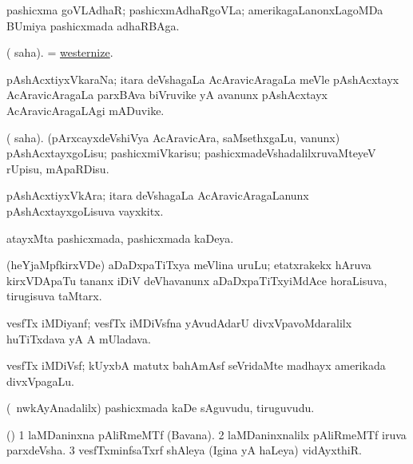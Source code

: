 \bentry
{} 
\gl{\nA}
\expl{}
\bmng
pashicxma goVLAdhaR; pashicxmAdhaRgoVLa; amerikagaLanonxLagoMDa BUmiya pashicxmada adhaRBAga. 
\emng
\eentry

\bentry
{} 
\gl{\sakirx}
\expl{}
\bmng
( saha). = \hyperlink{westernize}{westernize}. 
\emng
\eentry

\bentry
{} 
\gl{\nA}
\expl{}
\bmng
pAshAcxtiyxVkaraNa; itara deVshagaLa AcAravicAragaLa meVle pAshAcxtayx AcAravicAragaLa parxBAva biVruvike yA avanunx pAshAcxtayx AcAravicAragaLAgi mADuvike. 
\emng
\eentry

\bentry
{} 
\gl{\sakirx}
\expl{}
\bmng
( saha). (pArxcayxdeVshiVya AcAravicAra, saMsethxgaLu, \mo vanunx) pAshAcxtayxgoLisu; pashicxmiVkarisu; pashicxmadeVshadalilxruvaMteyeV rUpisu, mApaRDisu. 
\emng
\eentry

\bentry
{} 
\gl{\nA}
\expl{}
\bmng
pAshAcxtiyxVkAra; itara deVshagaLa AcAravicAragaLanunx pAshAcxtayxgoLisuva vayxkitx. 
\emng
\eentry

\bentry
{} 
\gl{\gu}
\expl{}
\bmng
atayxMta pashicxmada, pashicxmada kaDeya. 
\emng
\eentry

\bentry
{} 
\gl{\nA}
\expl{}
\bmng
(heYjaMpfkirxVDe) aDaDxpaTiTxya meVlina uruLu; etatxrakekx hAruva kirxVDApaTu tananx iDiV deVhavanunx aDaDxpaTiTxyiMdAce horaLisuva, tirugisuva taMtarx. 
\emng
\eentry

\bentry
{} 
\gl{\nA}
\expl{}
\bmng
vesfTx iMDiyanf; vesfTx iMDiVsfna yAvudAdarU divxVpavoMdaralilx huTiTxdava yA A mUladava. 
\emng
\eentry

\bentry
{} 
\gl{\nA}
\expl{}
\bmng
vesfTx iMDiVsf; kUyxbA matutx bahAmAsf seVridaMte madhayx amerikada divxVpagaLu. 
\emng
\eentry

\bentry
{} 
\gl{\nA}
\expl{}
\bmng
(\kanmu\ nwkAyAnadalilx) pashicxmada kaDe sAguvudu, tiruguvudu. 
\emng
\eentry

\bentry
{} 
\gl{\nA}
\expl{}
\bmng
(\birx) 
\bnum
\num{1} laMDaninxna pAliRmeMTf (Bavana). 
\num{2} laMDaninxnalilx pAliRmeMTf iruva parxdeVsha. 
\num{3} vesfTxminfsaTxrf shAleya (Igina yA haLeya) vidAyxthiR. 
\enum
\emng
\eentry

